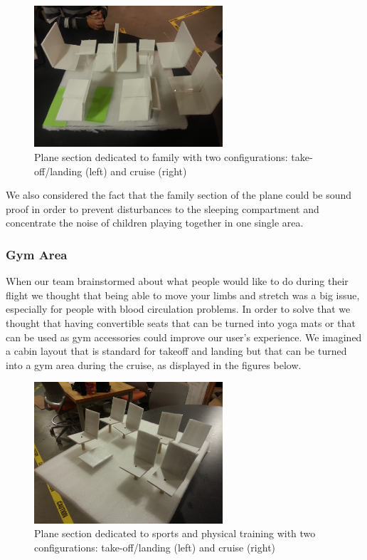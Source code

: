 \begin{figure}[h]
  \centering
     \includegraphics[width=7cm]{images/20140116_173112.jpg}
   \caption{Plane section dedicated to family with two configurations: take-off/landing (left) and cruise (right)}
  \label{fig:20140116_173112}
\end{figure}

We also considered the fact that the family section of the plane could be sound proof in order to prevent disturbances to the sleeping compartment and concentrate the noise of children playing together in one single area.

\subsubsection{Gym Area}
When our team brainstormed about what people would like to do during their flight we thought that being able to move your limbs and stretch was a big issue, especially for people with blood circulation problems. In order to solve that we thought that having convertible seats that can be turned into yoga mats or that can be used as gym accessories could improve our user’s experience. We imagined a cabin layout that is standard for takeoff and landing but that can be turned into a gym area during the cruise, as displayed in the figures below. \\

\begin{figure}[h]
  \centering
     \includegraphics[width=7cm]{images/20140116_172402.jpg}
   \caption{Plane section dedicated to sports and physical training with two configurations: take-off/landing (left) and cruise (right)}
  \label{fig:20140116_172402}
\end{figure}

